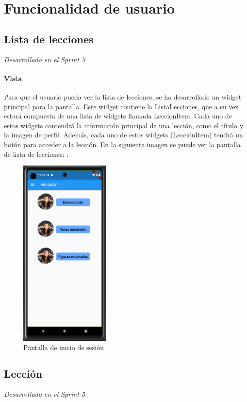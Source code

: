 \section{Funcionalidad de usuario}

\subsection{Lista de lecciones}
\textit{Desarrollado en el Sprint 5}

\label{sec:lista_lecciones}
\paragraph*{Vista}
Para que el usuario pueda ver la lista de lecciones, se ha desarrollado un widget principal para la pantalla. Este widget contiene la ListaLecciones, que a su vez estará compuesta de una lista de widgets llamada LeccionItem. Cada uno de estos widgets contendrá la información principal de una lección, como el título y la imagen de perfil. Además, cada uno de estos widgets (LecciónItem) tendrá un botón para acceder a la lección. En la siguiente imagen se puede ver la pantalla de lista de lecciones: : 

\begin{figure}[H]
  \centering
  \includegraphics[width=0.4\textwidth]{imagenes/c7/pantprin.png}
  \caption{Pantalla de inicio de sesión}
  \label{fig:login}
\end{figure}

\subsection{Lección} 
\textit{Desarrollado en el Sprint 5}

